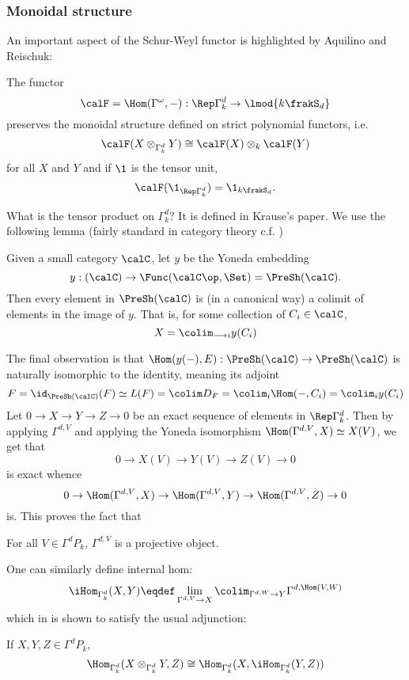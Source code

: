 \documentclass[12pt]{article}
\begin{document}
		\subsubsection{Monoidal structure}
		An important aspect of the Schur-Weyl functor is highlighted by Aquilino and Reischuk:
		\begin{thm}
			The functor 
			\[\calF=\Hom(\Gamma^\omega,-):\Rep\Gamma^d_k\to \lmod{k\frakS_d}\]
			preserves the monoidal structure defined on strict polynomial functors, i.e.
			\[\calF(X\otimes_{\Gamma_k^d}Y)\cong\calF(X)\otimes_k\calF(Y)\]
			for all $X$ and $Y$ and if $\1$ is the tensor unit, 
			\[\calF(\1_{\Rep\Gamma^d_k})=\1_{k\frakS_d}.\]
		\end{thm}

		What is the tensor product on $\Gamma^d_k?$ It is defined in Krause's paper. We use the following lemma (fairly standard in category theory c.f. \cite{maclane-moerdijk})
		\begin{lem}\label{lem:yoneda-dense}
			Given a small category $\calC$, let $y$ be the Yoneda embedding 
			\[y:(\calC)\to \Func(\calC\op,\Set)=\PreSh(\calC).\]
			Then every element in $\PreSh(\calC)$ is (in a canonical way) a colimit of elements in the image of $y$. That is, for some collection of $C_i\in \calC$,
			\[X=\colim_{\longrightarrow i}y(C_i)\]
		\end{lem}
		The final observation is that $\Hom(y(-),E):\PreSh(\calC)\to \PreSh(\calC)$ is naturally isomorphic to the identity, meaning its adjoint
		\[F=\id_{\PreSh(\calC)}(F)\simeq L(F)=\colim D_F=\colim_i \Hom(-,C_i)=\colim_i y(C_i)\]
		Let $0\to X\to Y\to Z\to 0$ be an exact sequence of elements in $\Rep\Gamma^d_k$. Then by applying $\Gamma^{d,V}$ and 
		applying the Yoneda isomorphism $\Hom(\Gamma^{d,V},X)\simeq X(V)$, we get that 
		\[0\to X(V)\to Y(V)\to Z(V)\to 0\]
		is exact whence 
		\[0\to \Hom(\Gamma^{d,V},X)\to \Hom(\Gamma^{d,V},Y)\to\Hom(\Gamma^{d,V},Z)\to 0\]
		is. This proves the fact that 
		\begin{lem}
			For all $V\in\Gamma^dP_k$, $\Gamma^{d,V}$ is a projective object.
		\end{lem}

		One can similarly define internal hom:
		\[\iHom_{\Gamma^d_k}(X,Y)\eqdef \lim_{\Gamma^{d,V}\to X}\colim_{\Gamma^{d,W}\to Y}\Gamma^{d,\Hom(V,W)}\]
		which in \cite[prop 2.4]{krause-strict-poly-func} is shown to satisfy the usual adjunction:
		\begin{prop}[Krause]
			If $X,Y,Z\in\Gamma^dP_k$, 
			\[\Hom_{\Gamma^d_k}(X\otimes_{\Gamma^d_k} Y,Z)\cong\Hom_{\Gamma^d_k}(X,\iHom_{\Gamma^d_k}(Y,Z))\]
		\end{prop}
\end{document}
